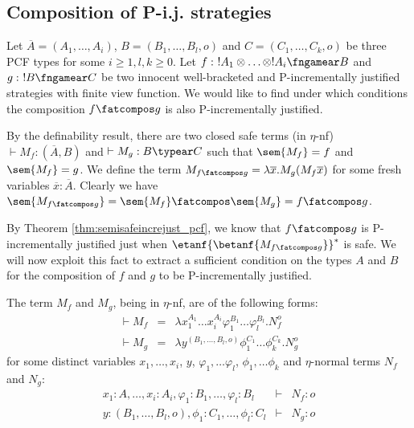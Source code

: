 \hrulefill

\subsection{Composition of P-i.j. strategies}

Let $\overline{A} = (A_1, \ldots, A_i)$,
$B = (B_1, \ldots, B_l,o)$
and $C=(C_1,\ldots,C_k,o)$ be three PCF types
for some $i\geq 1,l,k\geq 0$. Let
$f:\ !A_1 \otimes \ldots \otimes !A_i \fngamear B$ and $g:\ !B\fngamear C$ be two innocent well-bracketed and P-incrementally justified strategies with finite view function.
We would like to find under which conditions the composition $f\fatcompos g$ is also P-incrementally justified.

By the definability result, there are two closed safe terms (in $\eta$-nf) $\vdash M_f :(\overline{A},B)$  and $\vdash M_g :B \typear C$ such that $\sem{M_f} = f$
and $\sem{M_f} = g$.
We define the term $M_{f\fatcompos g} = \lambda \overline{x} . M_g (M_f \overline{x})$ for some fresh variables $\overline{x} : \overline{A}$. Clearly we have $\sem{M_{f\fatcompos g}} = \sem{M_f} \fatcompos \sem{M_g} = f\fatcompos g$.

By Theorem \ref{thm:semisafeincrejust_pcf}, we know that $f\fatcompos g$ is P-incrementally justified just when $\etanf{\betanf{M_{f\fatcompos g}}}^*$ is safe.
We will now exploit this fact to extract a sufficient condition on the types $A$ and $B$ for
the composition of $f$ and $g$ to be P-incrementally justified.

The term $M_f$ and $M_g$, being in $\eta$-nf, are of the following forms:
\begin{eqnarray*}
\vdash M_f &=& \lambda x_1^{A_1} \ldots x_i^{A_i} \varphi_1^{B_1} \ldots \varphi_l^{B_l} . N_f^o\\
\vdash  M_g &=& \lambda y^{ (B_1, \ldots, B_l,o)} \phi_1^{C_1} \ldots \phi_k^{C_k} . N_g^o
\end{eqnarray*}
for some distinct variables $x_1, \ldots, x_i$, $y$, $\varphi_1, \dots \varphi_l$, $\phi_1, \dots \phi_k$  and $\eta$-normal terms $N_f$ and $N_g$:
\begin{eqnarray*}
x_1:A, \ldots, x_i:A_i, \varphi_1:B_1, \dots, \varphi_l:B_l &\vdash& N_f :o \\
y: (B_1, \ldots, B_l,o), \phi_1:C_1, \dots, \phi_l:C_l &\vdash& N_g :o
\end{eqnarray*}



